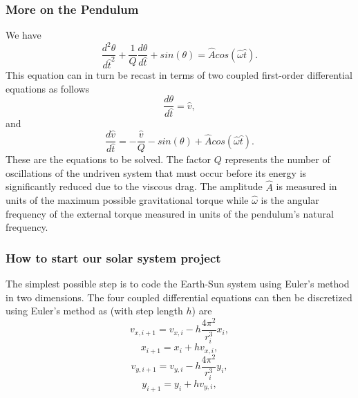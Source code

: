 \documentclass{beamer}
\begin{document}
\begin{frame}
\frametitle{More on the Pendulum}

\begin{block}{}
We have 
\[
    \frac{d^2\theta}{d\hat{t}^2}+\frac{1}{Q}\frac{d\theta}{d\hat{t}}  
     +sin(\theta)=\hat{A}cos(\hat{\omega}\hat{t}).
\]
This equation can in turn be recast in terms of two coupled first-order differential equations as follows
\[
     \frac{d\theta}{d\hat{t}}=\hat{v},
\]
and
\[
     \frac{d\hat{v}}{d\hat{t}}=-\frac{\hat{v}}{Q}-sin(\theta)+\hat{A}cos(\hat{\omega}\hat{t}).
\]
These are the equations to be solved.  The factor $Q$ represents the number of oscillations of the undriven system that must occur before  its energy is significantly reduced due to the viscous drag. The  amplitude $\hat{A}$ is measured in units of the maximum possible  gravitational torque while $\hat{\omega}$ is the angular frequency of the external torque measured in units of the pendulum's natural frequency.  
\end{block}
\end{frame}

\begin{frame}
\frametitle{How to start our solar system project}

\begin{block}{}

The simplest possible step is to code the Earth-Sun system using Euler's method in two dimensions.
The four coupled differential equations can then be discretized using Euler's method as (with step length $h$) are
\[
   v_{x,i+1}=v_{x,i}-h\frac{4\pi^2}{r_i^3}x_i,
\]
\[
   x_{i+1}=x_i+hv_{x,i},
\]
\[
   v_{y,i+1}=v_{y,i}-h\frac{4\pi^2}{r_i^3}y_i,
\]
\[
   y_{i+1}=y_i+hv_{y,i},
\]

\end{block}
\end{frame}
\end{document}
